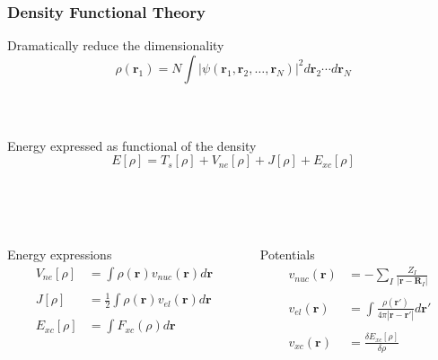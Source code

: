 \documentclass[mathserif, 10pt]{beamer}
\begin{document}
\begin{frame}
    \frametitle{Density Functional Theory}
    \centering
    Dramatically reduce the dimensionality
    \begin{equation}
	\nonumber
	\rho(\boldsymbol{r}_1) = N \int |\psi(\boldsymbol{r}_1, \boldsymbol{r}_2,\dots,
	\boldsymbol{r}_N)|^2 d\boldsymbol{r}_2\cdots d\boldsymbol{r}_N
    \end{equation}
    \ \\
    \ \\
    \ \\
    \pause
    Energy expressed as functional of the density
    \begin{equation}
	\nonumber
	E[\rho] = T_s[\rho] + V_{ne}[\rho] + J[\rho] + E_{xc}[\rho]
    \end{equation}
    \ \\
    \ \\
    \ \\
    \begin{columns}
    \begin{column}{.50\textwidth}
    \centering
    \pause
    Energy expressions
    \begin{align}
	\nonumber
	V_{ne}[\rho]	&= \int \rho(\boldsymbol{r})v_{nuc}(\boldsymbol{r})d\boldsymbol{r}\\
	\nonumber
			&\\
	\nonumber
	J[\rho] &= \frac{1}{2} \int \rho(\boldsymbol{r})v_{el}(\boldsymbol{r})d\boldsymbol{r}\\
	\nonumber
			&\\
	\nonumber
	E_{xc}[\rho]	&= \int F_{xc}(\rho) d\boldsymbol{r}
    \end{align}
    \end{column}
    \begin{column}{.50\textwidth}
    \centering
    \pause
    Potentials
    \begin{align}
	\nonumber
	v_{nuc}(\boldsymbol{r}) &= -\sum_I\frac{Z_I}{|\boldsymbol{r}-\boldsymbol{R}_I|}\\
	\nonumber
			&\\
	\nonumber
	v_{el}(\boldsymbol{r}) &= 
	    \int \frac{\rho(\boldsymbol{r}')}{4\pi|\boldsymbol{r}-\boldsymbol{r}'|} d\boldsymbol{r}'\\
	\nonumber
			&\\
	\nonumber
	v_{xc}(\boldsymbol{r}) &= \frac{\delta E_{xc}[\rho]}{\delta\rho}
    \end{align}
    \end{column}
    \end{columns}    
\end{frame}
\end{document}
